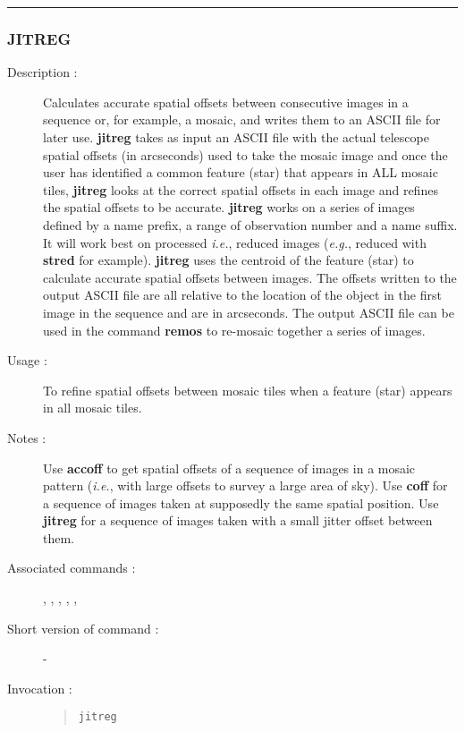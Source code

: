 \hrule
\subsubsection*{\label{JITREG}JITREG}

\begin{description}

\item[Description :] Calculates accurate spatial offsets
between consecutive images in a sequence or, for example, a mosaic, and
writes them to an ASCII file for later use.  {\bf jitreg} takes as input an
ASCII file with the actual telescope spatial offsets (in arcseconds)
used to take the mosaic image and once the user has identified a common
feature (star) that appears in ALL mosaic tiles, {\bf jitreg} looks at the
correct spatial offsets in each image and refines the spatial offsets
to be accurate.  {\bf jitreg} works on a series of images defined by a name
prefix, a range of observation number and a name suffix.  It will work
best on processed \emph{i.e.}, reduced images (\emph{e.g.}, reduced
with {\bf stred} for example).  {\bf jitreg} uses the centroid of the feature
(star) to calculate accurate spatial offsets between images.  The
offsets written to the output ASCII file are all relative to the
location of the object in the first image in the sequence and are in
arcseconds.  The output ASCII file can be used in the command {\bf remos} to
re-mosaic together a series of images.

\item[Usage :] To refine spatial offsets between mosaic tiles when a
feature (star) appears in all mosaic tiles.

\item[Notes :] Use {\bf accoff} to get spatial offsets of a sequence of
images in a mosaic pattern (\emph{i.e.}, with large offsets to survey a
large area of sky).  Use {\bf coff} for a sequence of images taken at
supposedly the same spatial position. Use {\bf jitreg} for a sequence
of images taken with a small jitter offset between them.

\item[Associated commands :] {\tt {}},
{\tt {}}, {\tt {}},
{\tt {}}, {\tt {}},
{\tt {}}
\item[Short version of command :] -
\item[Invocation :]

\begin{quote}{\tt  jitreg }\end{quote}

\end{description}


